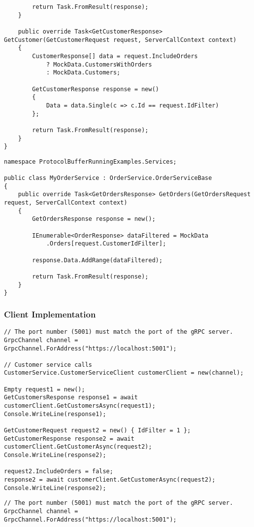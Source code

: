 \begin{multicols*}{2}
\begin{lstlisting}
        return Task.FromResult(response);
    }

    public override Task<GetCustomerResponse> GetCustomer(GetCustomerRequest request, ServerCallContext context)
    {
        CustomerResponse[] data = request.IncludeOrders
            ? MockData.CustomersWithOrders
            : MockData.Customers;

        GetCustomerResponse response = new()
        {
            Data = data.Single(c => c.Id == request.IdFilter)
        };

        return Task.FromResult(response);
    }
}
\end{lstlisting}
\begin{lstlisting}
namespace ProtocolBufferRunningExamples.Services;

public class MyOrderService : OrderService.OrderServiceBase
{
    public override Task<GetOrdersResponse> GetOrders(GetOrdersRequest request, ServerCallContext context)
    {
        GetOrdersResponse response = new();

        IEnumerable<OrderResponse> dataFiltered = MockData
            .Orders[request.CustomerIdFilter];

        response.Data.AddRange(dataFiltered);

        return Task.FromResult(response);
    }
}
\end{lstlisting}
\subsubsection{Client Implementation}
\begin{lstlisting}
// The port number (5001) must match the port of the gRPC server.
GrpcChannel channel = GrpcChannel.ForAddress("https://localhost:5001");

// Customer service calls
CustomerService.CustomerServiceClient customerClient = new(channel);

Empty request1 = new();
GetCustomersResponse response1 = await customerClient.GetCustomersAsync(request1); 
Console.WriteLine(response1);

GetCustomerRequest request2 = new() { IdFilter = 1 };
GetCustomerResponse response2 = await customerClient.GetCustomerAsync(request2); 
Console.WriteLine(response2);

request2.IncludeOrders = false;
response2 = await customerClient.GetCustomerAsync(request2);
Console.WriteLine(response2);
\end{lstlisting}
\begin{lstlisting}
// The port number (5001) must match the port of the gRPC server.
GrpcChannel channel = GrpcChannel.ForAddress("https://localhost:5001");


\end{lstlisting}
\end{multicols*}
